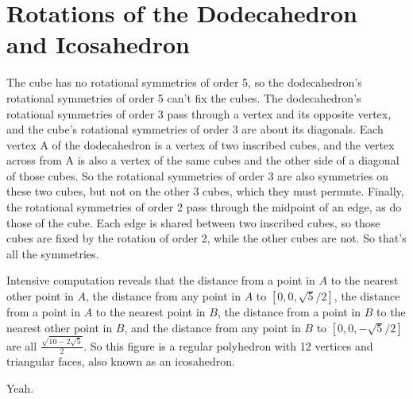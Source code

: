 \documentclass[11pt, oneside]{article}   	%
\begin{document}
\section{Rotations of the Dodecahedron and Icosahedron}
\be
\item The cube has no rotational symmetries of order 5, so the dodecahedron's rotational symmetries of order 5 can't fix the cubes. The dodecahedron's rotational symmetries of order 3 pass through a vertex and its opposite vertex, and the cube's rotational symmetries of order 3 are about its diagonals. Each vertex A of the dodecahedron is a vertex of two inscribed cubes, and the vertex across from A is also a vertex of the same cubes and the other side of a diagonal of those cubes. So the rotational symmetries of order 3 are also symmetries on these two cubes, but not on the other 3 cubes, which they must permute. Finally, the rotational symmetries of order 2 pass through the midpoint of an edge, as do those of the cube. Each edge is shared between two inscribed cubes, so those cubes are fixed by the rotation of order 2, while the other cubes are not. So that's all the symmetries.
\item Intensive computation reveals that the distance from a point in $A$ to the nearest other point in $A$, the distance from any point in $A$ to $[0, 0, \sqrt{5}/2]$, the distance from a point in $A$ to the nearest point in $B$, the distance from a point in $B$ to the nearest other point in $B$, and the distance from any point in $B$ to $[0, 0, -\sqrt{5}/2]$ are all $\frac{\sqrt{10-2\sqrt{5}}}{2}$. So this figure is a regular polyhedron with 12 vertices and triangular faces, also known as an icosahedron. 
\item Yeah.
\ee
\end{document}
